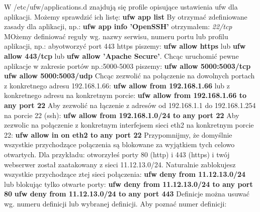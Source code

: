 \documentclass[a4paper,titlepage,12pt]{mwart}
\begin{document}
W /etc/ufw/applications.d znajdują się profile opisujące ustawienia ufw dla aplikacji. Możemy sprawdzić ich listę:\newline
\textbf{ufw app list}\newline
By otrzymać zdefiniowane zasady dla aplikacji, np.:
\textbf{ufw app info 'OpenSSH'} otrzymałem:\newline
\textit{22/tcp}\newline
{}
MOżemy definiować reguły wg. nazwy serwisu, numeru portu lub profilu aplikacji, np.: abyotworzyć port 443 https piszemy:\newline
\textbf{ufw allow https} lub\newline
\textbf{ufw allow 443/tcp} lub\newline
\textbf{ufw allow 'Apache Secure'}.\newline
{}
Chcąc uruchomić pewne aplikacje w zakresie portów np.:5000-5003 piszemy:
\textbf{ufw allow 5000:5003/tcp}\newline
\textbf{ufw allow 5000:5003/udp}\newline
{}
Chcąc zezwolić na połączenie na dowolnych portach z konkretnego adresu 192.168.1.66:
\textbf{ufw allow from 192.168.1.66} lub z konkretnego adresu na konkretnym porcie:\newline
\textbf{ufw allow from 192.168.1.66 to any port 22}
Aby zezwolić na łączenie z adresów od 192.168.1.1 do 192.168.1.254 na porcie 22 (ssh):
\textbf{ufw allow from 192.168.1.0/24 to any port 22}
Aby zezwolic na połączenie z konkretnym interfejsem sieci eth2 na konkretnym porcie 22:
\textbf{ufw allow in on eth2 to any port 22}
Przypomnijmy, że domyślnie wszystkie przychodzące połączenia są blokowane za wyjątkiem tych celowo otwartych. Dla przykładu: otworzyłeś porty 80 (http) i 443 (https) i twój webserwer został zaatakowany z sieci 11.12.13.0/24. Naturalnie zablokujesz wszystkie przychodzące ztej sieci połączenia:
\textbf{ufw deny from 11.12.13.0/24} lub blokując tylko otwarte porty:
\textbf{ufw deny from 11.12.13.0/24 to any port 80} 
\textbf{ufw deny from 11.12.13.0/24 to any port 443} 
Definicje można usuwać wg. numeru definicji lub wybranej definicji. Aby poznać numer definicji:
\end{document}

